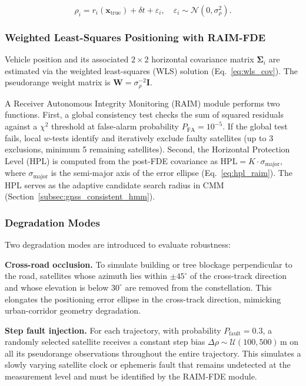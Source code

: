 \documentclass[letterpaper,journal]{IEEEtran}
\begin{document}
\begin{equation}
\rho_i = r_i(\mathbf{x}_{\text{true}}) + \delta t + \varepsilon_i,\quad
\varepsilon_i \sim \mathcal{N}(0,\sigma_{\rho}^2).
\label{eq:sim_pr}
\end{equation}

\subsubsection{Weighted Least-Squares Positioning with RAIM-FDE}

Vehicle position and its associated $2\times 2$ horizontal covariance matrix
$\boldsymbol{\Sigma}_i$ are estimated via the weighted least-squares (WLS)
solution (Eq.~\eqref{eq:wls_cov}). The pseudorange
weight matrix is $\mathbf{W} = \sigma_{\rho}^{-2}\mathbf{I}$.

A Receiver Autonomous Integrity Monitoring (RAIM) module performs two functions. First, a global consistency test checks the sum of squared residuals against a $\chi^2$ threshold at false-alarm probability $P_{\text{FA}}=10^{-5}$. If the global test fails, local $w$-tests identify and iteratively exclude faulty satellites (up to 3 exclusions, minimum 5 remaining satellites). Second, the Horizontal Protection Level (HPL) is computed from the post-FDE covariance as $\text{HPL} = K\cdot \sigma_{\text{major}}$, where $\sigma_{\text{major}}$ is the semi-major axis of the error ellipse (Eq.~\eqref{eq:hpl_raim}). The HPL serves as the adaptive candidate search radius in CMM (Section~\ref{subsec:gnss_consistent_hmm}).

\subsubsection{Degradation Modes}

Two degradation modes are introduced to evaluate robustness:

\textbf{Cross-road occlusion.} To simulate building or tree blockage perpendicular to the road, satellites whose azimuth lies within $\pm 45^\circ$ of the cross-track direction and whose elevation is below $30^\circ$ are removed from the constellation. This elongates the positioning error ellipse in the cross-track direction, mimicking urban-corridor geometry degradation.

\textbf{Step fault injection.} For each trajectory, with probability $P_{\text{fault}}=0.3$, a randomly selected satellite receives a constant step bias $\Delta\rho \sim \mathcal{U}(100,500)$\,m on all its pseudorange observations throughout the entire trajectory. This simulates a slowly varying satellite clock or ephemeris fault that remains undetected at the measurement level and must be identified by the RAIM-FDE module.
\end{document}

